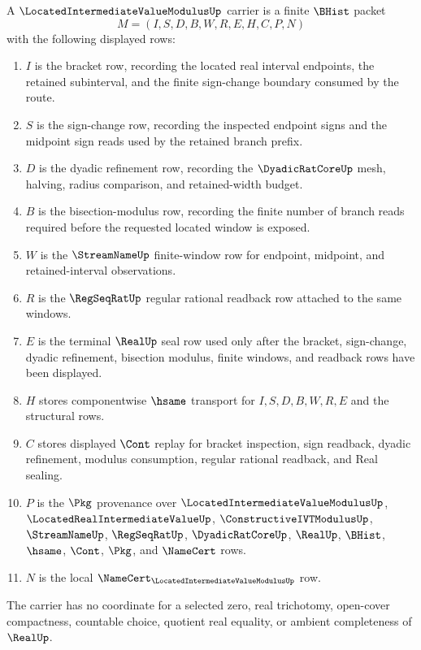 \begin{definition}\label{def:located-intermediate-value-modulus-carrier}
A $\LocatedIntermediateValueModulusUp$ carrier is a finite $\BHist$ packet
$$
M=(I,S,D,B,W,R,E,H,C,P,N)
$$
with the following displayed rows:
\begin{enumerate}
\item $I$ is the bracket row, recording the located real interval endpoints, the retained subinterval, and the finite sign-change boundary consumed by the route.
\item $S$ is the sign-change row, recording the inspected endpoint signs and the midpoint sign reads used by the retained branch prefix.
\item $D$ is the dyadic refinement row, recording the $\DyadicRatCoreUp$ mesh, halving, radius comparison, and retained-width budget.
\item $B$ is the bisection-modulus row, recording the finite number of branch reads required before the requested located window is exposed.
\item $W$ is the $\StreamNameUp$ finite-window row for endpoint, midpoint, and retained-interval observations.
\item $R$ is the $\RegSeqRatUp$ regular rational readback row attached to the same windows.
\item $E$ is the terminal $\RealUp$ seal row used only after the bracket, sign-change, dyadic refinement, bisection modulus, finite windows, and readback rows have been displayed.
\item $H$ stores componentwise $\hsame$ transport for $I,S,D,B,W,R,E$ and the structural rows.
\item $C$ stores displayed $\Cont$ replay for bracket inspection, sign readback, dyadic refinement, modulus consumption, regular rational readback, and Real sealing.
\item $P$ is the $\Pkg$ provenance over $\LocatedIntermediateValueModulusUp$, $\LocatedRealIntermediateValueUp$, $\ConstructiveIVTModulusUp$, $\StreamNameUp$, $\RegSeqRatUp$, $\DyadicRatCoreUp$, $\RealUp$, $\BHist$, $\hsame$, $\Cont$, $\Pkg$, and $\NameCert$ rows.
\item $N$ is the local $\NameCert_{\LocatedIntermediateValueModulusUp}$ row.
\end{enumerate}
The carrier has no coordinate for a selected zero, real trichotomy, open-cover compactness, countable choice, quotient real equality, or ambient completeness of $\RealUp$.
\end{definition}

